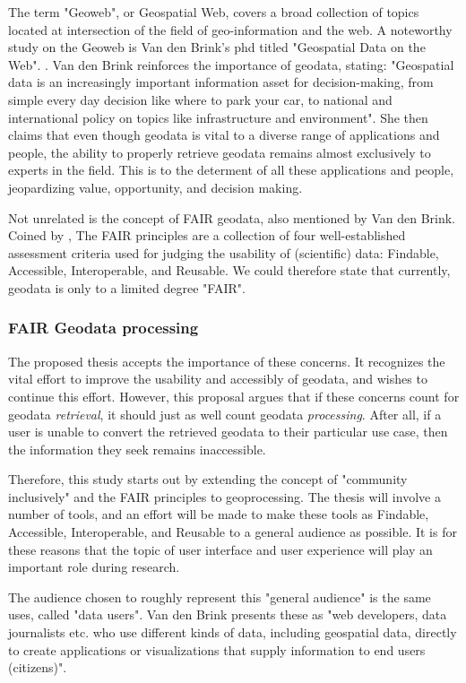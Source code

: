 The term "Geoweb", or Geospatial Web, covers a broad collection of topics located at intersection of the field of geo-information and the web.
A noteworthy study on the Geoweb is Van den Brink's phd titled "Geospatial Data on the Web". \cite{brink_geospatial_2018}. 
Van den Brink reinforces the importance of geodata, stating: "Geospatial data is an increasingly important information asset for decision-making, from simple every day decision like where to park your car, to national and international policy on topics like infrastructure and environment". 
She then claims that even though geodata is vital to a diverse range of applications and people, the ability to properly retrieve geodata remains almost exclusively to experts in the field. 
This is to the determent of all these applications and people, jeopardizing value, opportunity, and decision making.

Not unrelated is the concept of FAIR geodata, also mentioned by Van den Brink. 
Coined by \cite{mark_d_wilkinson_fair_2016}, The FAIR principles are a collection of four well-established assessment criteria used for judging the usability of (scientific) data: Findable, Accessible, Interoperable, and Reusable. 
We could therefore state that currently, geodata is only to a limited degree "FAIR".

\subsubsection*{FAIR Geodata processing}

The proposed thesis accepts the importance of these concerns. 
It recognizes the vital effort to improve the usability and accessibly of geodata, and wishes to continue this effort. However, this proposal argues that if these concerns count for geodata \textit{retrieval}, it should just as well count geodata \textit{processing}. After all, if a user is unable to convert the retrieved geodata to their particular use case, then the information they seek remains inaccessible. 

Therefore, this study starts out by extending the concept of "community inclusively" and the FAIR principles to geoprocessing. The thesis will involve a number of tools, and an effort will be made to make these tools as Findable, Accessible, Interoperable, and Reusable to a general audience as possible. It is for these reasons that the topic of user interface and user experience will play an important role during research. 

The audience chosen to roughly represent this "general audience" is the same \cite{brink_geospatial_2018} uses, called "data users". Van den Brink presents these as "web developers, data journalists etc. who use different kinds of data, including geospatial data, directly to create applications or visualizations that supply information to end users (citizens)".

